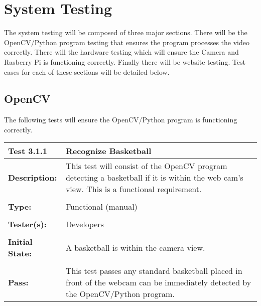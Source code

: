 \documentclass{article}
\begin{document}
\newpage
\section{System Testing}
The system testing will be composed of three major sections. There will be the OpenCV/Python program testing that ensures the program processes the video correctly. There will the hardware testing which will ensure the Camera and Rasberry Pi is functioning correctly. Finally there will be website testing. Test cases for each of these sections will be detailed below. 

\subsection {OpenCV}
The following tests will ensure the OpenCV/Python program is functioning correctly. 

\begin{tabularx}{\textwidth}{p{2cm}p{9cm}}
\toprule 
{\bf Test 3.1.1} & {\bf Recognize Basketball}\\
\midrule
\textbf{Description:} & This test will consist of the OpenCV program detecting a basketball if it is within the web cam's view. This is a functional requirement. \\[0.3\baselineskip]
                      &                     \\
\textbf{Type:} & Functional (manual)   \\[0.3\baselineskip]
                      &                     \\
\textbf{Tester(s):} & Developers \\[0.3\baselineskip]
                      &                     \\
\textbf{Initial State:} & A basketball is within the camera view. \\[0.3\baselineskip]
                      &                     \\
\textbf{Pass:} & This test passes any standard basketball placed in front of the webcam can be immediately detected by the OpenCV/Python program. \\[0.3\baselineskip]
\end{tabularx}
\end{document}
